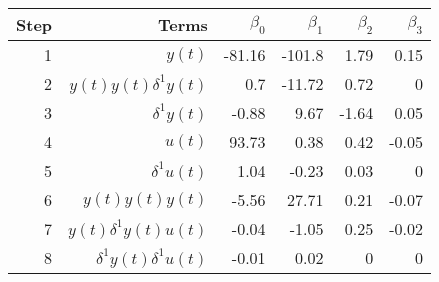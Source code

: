 \begin{tabular}{rrrrrr}
Step & Terms & $\beta_{0}$ & $\beta_{1}$ & $\beta_{2}$ & $\beta_{3}$ \\ 
\hline 
1 & $y(t)$ & -81.16 & -101.8 & 1.79 & 0.15 \\ 
2 & $y(t)y(t)\delta^1 y(t)$ & 0.7 & -11.72 & 0.72 & 0 \\ 
3 & $\delta^1 y(t)$ & -0.88 & 9.67 & -1.64 & 0.05 \\ 
4 & $u(t)$ & 93.73 & 0.38 & 0.42 & -0.05 \\ 
5 & $\delta^1 u(t)$ & 1.04 & -0.23 & 0.03 & 0 \\ 
6 & $y(t)y(t)y(t)$ & -5.56 & 27.71 & 0.21 & -0.07 \\ 
7 & $y(t)\delta^1 y(t)u(t)$ & -0.04 & -1.05 & 0.25 & -0.02 \\ 
8 & $\delta^1 y(t)\delta^1 u(t)$ & -0.01 & 0.02 & 0 & 0 \\ 
\hline 
\end{tabular}
